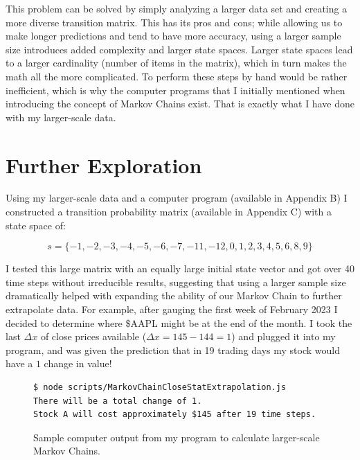 \documentclass[12pt,final]{article}
\begin{document}
This problem can be solved by simply analyzing a larger data set and creating a more diverse transition
matrix. This has its pros and cons; while allowing us to make longer predictions and tend to have more
accuracy, using a larger sample size introduces added complexity and larger state spaces. Larger state spaces
lead to a larger cardinality (number of items in the matrix), which in turn makes the math all the more
complicated. To perform these steps by hand would be rather inefficient, which is why the computer programs
that I initially mentioned when introducing the concept of Markov Chains exist. That is exactly what I have done
with my larger-scale data.

\section{Further Exploration}

Using my larger-scale data and a computer program (available in Appendix B) I constructed a transition
probability matrix (available in Appendix C) with a state space of:

\begin{equation}
  s=\{-1, -2, -3, -4, -5, -6, -7, -11, -12, 0, 1, 2, 3, 4, 5, 6, 8, 9\}
  \label{eq:statespaceoflargerchangeinclose}
\end{equation}

I tested this large matrix with an equally large initial state vector and got over 40 time steps without
irreducible results, suggesting that using a larger sample size dramatically helped with expanding the ability
of our Markov Chain to further extrapolate data. For example, after gauging the first week of February 2023 I
decided to determine where \$AAPL might be at the end of the month. I took the last $\Delta{x}$ of close
prices available ($\Delta{x}=145-144=1$) and plugged it into my program, and was given the prediction that in
19 trading days my stock would have a $1$ change in value!

\begin{figure}[H]
  \begin{center}
    \begin{minipage}[c]{0.95\textwidth}
    \begin{verbatim}
$ node scripts/MarkovChainCloseStatExtrapolation.js
There will be a total change of 1.
Stock A will cost approximately $145 after 19 time steps.
    \end{verbatim}
    \end{minipage}
  \end{center}
  \caption{Sample computer output from my program to calculate larger-scale Markov Chains.}
  \label{fig:samplecomputeroutput}
\end{figure}
\end{document}
